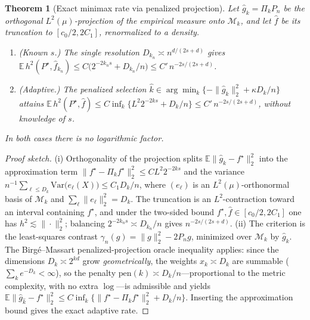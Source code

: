 \documentclass[12pt]{article}
\newtheorem{theorem}{Theorem}[section]
\numberwithin{equation}{section}
\begin{document}
	\begin{theorem}[Exact minimax rate via penalized projection]
		\label{thm:exact-proj}
		Let $\widehat g_k=\Pi_k P_n$ be the orthogonal $L^2(\mu)$-projection of the
		empirical measure onto $\mathcal{M}_k$, and let $\widehat f$ be its
		truncation to $[c_0/2,2C_1]$, renormalized to a density.
		\begin{enumerate}
			\item \emph{(Known $s$.)} The single resolution $D_{k_n}\asymp
			n^{d/(2s+d)}$ gives
			$\mathbb{E}\,h^2(P^{\star},\widehat f_{k_n})\le C\big(2^{-2k_n s}
			+D_{k_n}/n\big)\le C'\,n^{-2s/(2s+d)}$.
			\item \emph{(Adaptive.)} The penalized selection $\widehat k\in
			\arg\min_k\{-\|\widehat g_k\|_2^2+\kappa D_k/n\}$ attains
			$\mathbb{E}\,h^2(P^{\star},\widehat f)\le C\inf_k\{L^2 2^{-2ks}+D_k/n\}
			\le C'\,n^{-2s/(2s+d)}$, without knowledge of $s$.
		\end{enumerate}
		In both cases there is \emph{no} logarithmic factor.
	\end{theorem}

	\begin{proof}[Proof sketch]
		(i) Orthogonality of the projection splits
		$\mathbb{E}\|\widehat g_k-f^{\star}\|_2^2$ into the approximation term
		$\|f^{\star}-\Pi_k f^{\star}\|_2^2\le C L^2 2^{-2ks}$ and the variance
		$n^{-1}\sum_{\ell\le D_k}\mathrm{Var}\big(e_\ell(X)\big)\le C_1 D_k/n$,
		where $(e_\ell)$ is an $L^2(\mu)$-orthonormal basis of $\mathcal{M}_k$ and
		$\sum_\ell\|e_\ell\|_2^2=D_k$. The truncation is an $L^2$-contraction toward
		an interval containing $f^{\star}$, and under the two-sided bound
		$f^{\star},\widehat f\in[c_0/2,2C_1]$ one has $h^2\lesssim\|\cdot\|_2^2$;
		balancing $2^{-2k_n s}\asymp D_{k_n}/n$ gives $n^{-2s/(2s+d)}$.
		(ii) The criterion is the least-squares contrast
		$\gamma_n(g)=\|g\|_2^2-2P_n g$, minimized over $\mathcal{M}_k$ by
		$\widehat g_k$. The Birgé--Massart penalized-projection oracle inequality
		\citep{BirgeMassart1998,Massart2007} applies: since the dimensions
		$D_k\asymp 2^{kd}$ grow \emph{geometrically}, the weights $x_k\asymp D_k$
		are summable ($\sum_k e^{-D_k}<\infty$), so the penalty
		$\mathrm{pen}(k)\asymp D_k/n$---proportional to the metric complexity, with
		no extra $\log$---is admissible and yields
		$\mathbb{E}\|\widehat g_{\widehat k}-f^{\star}\|_2^2\le
		C\inf_k\{\|f^{\star}-\Pi_k f^{\star}\|_2^2+D_k/n\}$. Inserting the
		approximation bound gives the exact adaptive rate.
	\end{proof}
\end{document}
